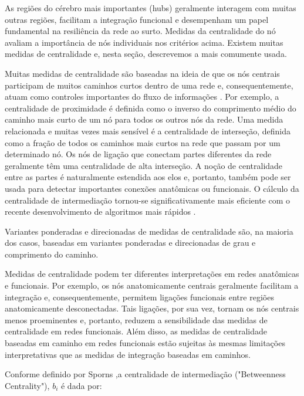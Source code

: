 \documentclass[
	12pt,				%
	openright,			%
	twoside,			%
	a4paper,			%
	english,			%
	french,				%
	spanish,			%
	brazil				%
	]{abntex2}
\begin{document}
As regiões do cérebro mais importantes (hubs) geralmente interagem com muitas outras regiões, facilitam a integração funcional e desempenham um papel fundamental na resiliência da rede ao surto. Medidas da centralidade do nó avaliam a importância de nós individuais nos critérios acima. Existem muitas medidas de centralidade e, nesta seção, descrevemos a mais comumente usada. 

Muitas medidas de centralidade são baseadas na ideia de que os nós centrais participam de muitos caminhos curtos dentro de uma rede e, consequentemente, atuam como controles importantes do fluxo de informações \cite{FREEMAN1978215}. Por exemplo, a centralidade de proximidade é definida como o inverso do comprimento médio do caminho mais curto de um nó para todos os outros nós da rede. Uma medida relacionada e muitas vezes mais sensível é a centralidade de interseção, definida como a fração de todos os caminhos mais curtos na rede que passam por um determinado nó. Os nós de ligação que conectam partes diferentes da rede geralmente têm uma centralidade de alta interseção.
A noção de centralidade entre as partes é naturalmente estendida aos elos e, portanto, também pode ser usada para detectar importantes conexões anatômicas ou funcionais. O cálculo da centralidade de intermediação tornou-se significativamente mais eficiente com o recente desenvolvimento de algoritmos mais rápidos \cite{sporns2010networks}.

Variantes ponderadas e direcionadas de medidas de centralidade são, na maioria dos casos, baseadas em variantes ponderadas e direcionadas de grau e comprimento do caminho.

Medidas de centralidade podem ter diferentes interpretações em redes anatômicas e funcionais. Por exemplo, os nós anatomicamente centrais geralmente facilitam a integração e, consequentemente, permitem ligações funcionais entre regiões anatomicamente desconectadas. Tais ligações, por sua vez, tornam os nós centrais menos proeminentes e, portanto, reduzem a sensibilidade das medidas de centralidade em redes funcionais. Além disso, as medidas de centralidade baseadas em caminho em redes funcionais estão sujeitas às mesmas limitações interpretativas que as medidas de integração baseadas em caminhos.

Conforme definido por Sporns \cite{sporns2010networks},a centralidade de intermediação ("Betweenness Centrality"), $b_{i}$ é dada por:
\end{document}
